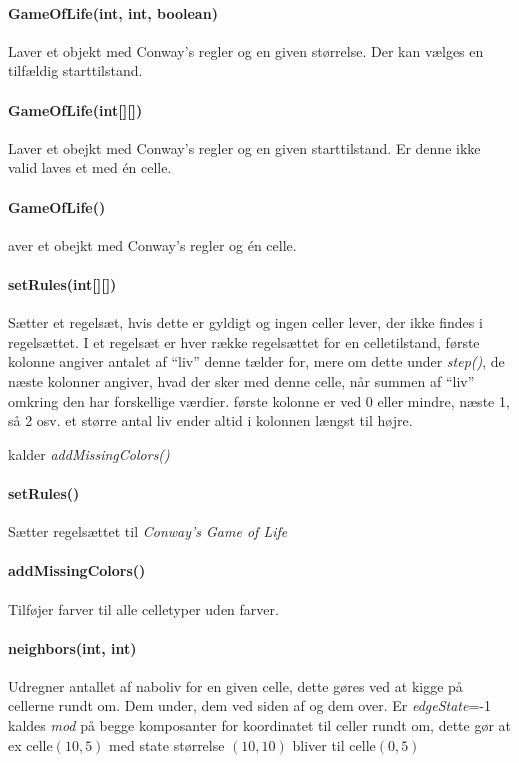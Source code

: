 \paragraph{ GameOfLife(int, int, boolean)} Laver et \gol objekt med Conway's regler og en given størrelse. Der kan vælges en tilfældig starttilstand.

\paragraph{ GameOfLife(int[][]) } Laver et \gol obejkt med Conway's regler og en given starttilstand. Er denne ikke valid laves et \gol med én celle.

\paragraph{GameOfLife()} aver et \gol obejkt med Conway's regler og én celle.

\paragraph{setRules(int[][])} Sætter et regelsæt, hvis dette er gyldigt og ingen celler lever, der ikke findes i regelsættet.
I et regelsæt er hver række regelsættet for en celletilstand, første kolonne angiver antalet af ``liv'' denne tælder for,
mere om dette under \emph{step()}, de næste kolonner angiver, hvad der sker med denne celle, når summen af ``liv''
omkring den har forskellige værdier. første kolonne er ved 0 eller mindre, næste 1, så 2 osv. et større antal liv ender altid i kolonnen længst til højre.

kalder \emph{addMissingColors()}

\paragraph{setRules()} Sætter regelsættet til \emph{Conway's Game of Life}

\paragraph{addMissingColors()} Tilføjer farver til alle celletyper uden farver.

\paragraph{neighbors(int, int)} Udregner antallet af naboliv for en given celle, dette gøres ved at kigge på cellerne rundt om.
Dem under, dem ved siden af og dem over. 
Er \emph{edgeState}=-1 kaldes \emph{mod} på begge komposanter for koordinatet til celler rundt om,
dette gør at ex celle$(10, 5)$ med state størrelse $(10, 10)$ bliver til celle$(0, 5)$

